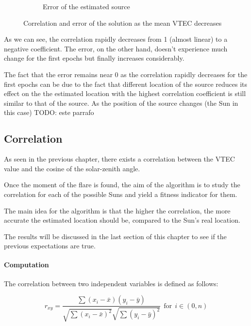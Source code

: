 \begin{figure}[!htb]
\begin{subfigure}[b]{0.5\textwidth}
		\caption{Error of the estimated source}
	\end{subfigure}
	\caption{Correlation and error of the solution as the mean VTEC decreases}
	\label{fig:differentEpochs}
\end{figure}

As we can see, the correlation rapidly decreases from 1 (almost linear) to a negative coefficient. The error, on the other hand, doesn't experience much change for the first epochs but finally increases considerably. 

The fact that the error remains near 0 as the correlation rapidly decreases for the first epochs can be due to the fact that different location of the source reduces its effect on the  the estimated location with the highest correlation coefficient is still similar to that of the source. As the position of the source changes (the Sun in this case)  TODO: este parrafo

\subsection{Correlation}

As seen in the previous chapter, there exists a correlation between the VTEC value and the cosine of the solar-zenith angle. 

Once the moment of the flare is found, the aim of the algorithm is to study the correlation for each of the possible Suns and yield a fitness indicator for them. 

The main idea for the algorithm is that the higher the correlation, the more accurate the estimated location should be, compared to the Sun's real location. 

The results will be discussed in the last section of this chapter to see if the previous expectations are true.

\paragraph{Computation}

The correlation between two independent variables is defined as follows:

\begin{equation} \label{eq:coefficient}
r_{xy} = \frac{\sum(x_{i} - \bar{x})(y_{i} - \bar{y})}
{\sqrt{\sum(x_{i} - \bar{x})^{2}}
	\sqrt{\sum(y_{i} - \bar{y})^{2}}} \ \ \text{for} \ \ i \in (0, n)
\end{equation} \\

